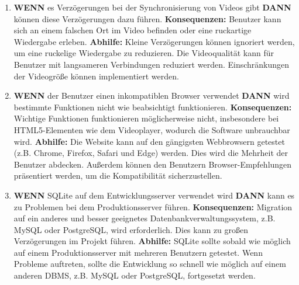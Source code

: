 \begin{enumerate}
    \item
    \textbf{WENN} es Verzögerungen bei der Synchronisierung von Videos gibt \textbf{DANN} können diese Verzögerungen dazu führen.
    \linebreak
    \linebreak
    \textbf{Konsequenzen:} Benutzer kann sich an einem falschen Ort im Video befinden oder eine ruckartige Wiedergabe erleben.
    \linebreak
    \linebreak
    \textbf{Abhilfe:}  Kleine Verzögerungen können ignoriert werden, um eine ruckelige Wiedergabe zu reduzieren. Die Videoqualität kann für Benutzer mit langsameren Verbindungen reduziert werden. Einschränkungen der Videogröße können implementiert werden.
    \linebreak
    
    \item
    \textbf{WENN} der Benutzer einen inkompatiblen Browser verwendet \textbf{DANN} wird  bestimmte Funktionen nicht wie beabsichtigt funktionieren.
    \linebreak
    \linebreak
    \textbf{Konsequenzen:} Wichtige Funktionen funktionieren möglicherweise nicht, insbesondere bei HTML5-Elementen wie dem Videoplayer, wodurch die Software unbrauchbar wird.
    \linebreak
    \linebreak
    \textbf{Abhilfe:} Die Website kann auf den gängigsten Webbrowsern getestet (z.B. Chrome, Firefox, Safari und Edge) werden. Dies wird die Mehrheit der Benutzer abdecken. Außerdem können den Benutzern Browser-Empfehlungen präsentiert werden, um die Kompatibilität sicherzustellen.
    \linebreak
    
    \item
    \textbf{WENN} SQLite auf dem Entwicklungsserver verwendet wird \textbf{DANN} kann es zu Problemen bei dem Produktionsserver führen.
    \linebreak
    \linebreak
    \textbf{Konsequenzen:} Migration auf ein anderes und besser geeignetes Datenbankverwaltungssystem, z.B.  MySQL oder PostgreSQL,  wird erforderlich.  Dies kann zu großen Verzögerungen im Projekt führen.
    \linebreak
    \linebreak
    \textbf{Abhilfe:} SQLite sollte sobald wie möglich auf einem Produktionsserver mit mehreren Benutzern getestet. Wenn Probleme auftreten, sollte die Entwicklung so schnell wie möglich auf einem anderen DBMS, z.B.  MySQL oder PostgreSQL, fortgesetzt werden.
    \linebreak


\end{enumerate}


